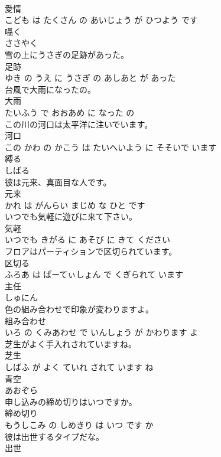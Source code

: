 \documentclass[8pt]{extreport}
\begin{document}
\begin{CJK}{UTF8}{min}
\\	愛情 
\\	こども は たくさん の あいじょう が ひつよう です			
\\	囁く	
\\	ささやく			
\\	雪の上にうさぎの足跡があった。	
\\	足跡 
\\	ゆき の うえ に うさぎ の あしあと が あった			
\\	台風で大雨になったの。	
\\	大雨 
\\	たいふう で おおあめ に なった の			
\\	この川の河口は太平洋に注いでいます。	
\\	河口 
\\	この かわ の かこう は たいへいよう に そそいで います			
\\	縛る	
\\	しばる			
\\	彼は元来、真面目な人です。	
\\	元来 
\\	かれ は がんらい まじめ な ひと です			
\\	いつでも気軽に遊びに来て下さい。	
\\	気軽 
\\	いつでも きがる に あそび に きて ください			
\\	フロアはパーティションで区切られています。	
\\	区切る 
\\	ふろあ は ぱーてぃしょん で くぎられて います			
\\	主任	
\\	しゅにん			
\\	色の組み合わせで印象が変わりますよ。	
\\	組み合わせ 
\\	いろ の くみあわせ で いんしょう が かわります よ			
\\	芝生がよく手入れされていますね。	
\\	芝生 
\\	しばふ が よく ていれ されて います ね			
\\	青空	
\\	あおぞら			
\\	申し込みの締め切りはいつですか。	
\\	締め切り 
\\	もうしこみ の しめきり は いつ です か			
\\	彼は出世するタイプだな。	
\\	出世 

\end{CJK}
\end{document}
